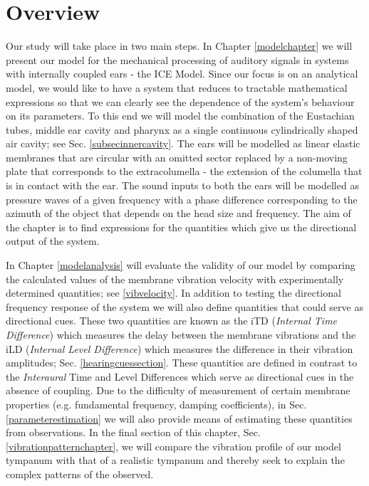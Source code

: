 \section{Overview}
Our study will take place in two main steps. In Chapter \ref{modelchapter} we will
present our model for the mechanical processing of auditory signals in systems with internally coupled ears - the ICE Model.
Since our focus is on an analytical model, we would like to have a system that reduces to tractable mathematical expressions
so that we can clearly see the dependence of the system's behaviour on its parameters. To this end we will model the 
combination of the Eustachian tubes, middle ear cavity and pharynx as a single continuous cylindrically shaped air cavity; see
Sec. \ref{subsecinnercavity}. The ears will be modelled as linear elastic membranes that are circular with an omitted sector replaced
by a non-moving plate
that corresponds to the extracolumella - the extension of the columella that is in contact with the ear. The
sound inputs to both the ears will be modelled as pressure waves of a given frequency with a phase difference corresponding to the azimuth of the object that depends on the 
head size and frequency. The aim of the chapter is to find expressions for the quantities which give us the directional output of the system.

In Chapter \ref{modelanalysis} will evaluate the validity of our model
by comparing the calculated values of the membrane vibration velocity with experimentally determined quantities; 
see \ref{vibvelocity}. In addition to testing the directional frequency
response of the system we will also define quantities that could serve as directional cues. These two quantities are known
as the iTD (\emph{Internal Time Difference}) which measures the delay between the membrane vibrations and the iLD (\emph{Internal Level
Difference}) which measures the difference in their vibration amplitudes; Sec. \ref{hearingcuessection}. These quantities are defined in contrast to the
\emph{Interaural} Time and Level  Differences which serve as directional cues in the absence of coupling. Due to the difficulty of measurement of certain membrane
properties (e.g. fundamental frequency, damping coefficients), in Sec. \ref{parameterestimation} we will also provide means of estimating these quantities from observations.
In the final section of this chapter, Sec. \ref{vibrationpatternchapter}, we will compare the vibration profile of our model tympanum with that of a realistic tympanum and thereby
seek to explain the complex patterns of the observed.

